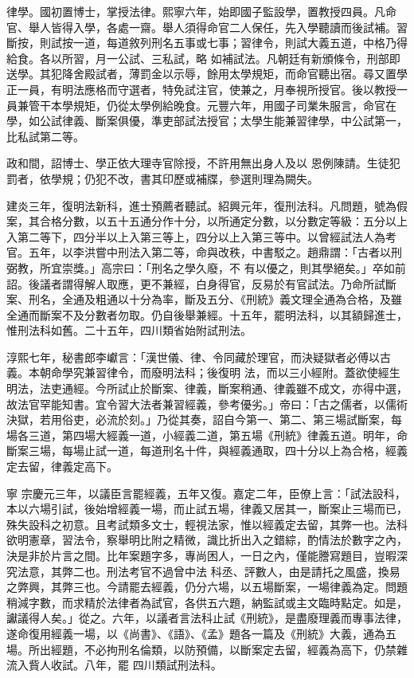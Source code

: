 \begin{pinyinscope}
 律學。國初置博士，掌授法律。熙寧六年，始即國子監設學，置教授四員。凡命官、舉人皆得入學，各處一齋。舉人須得命官二人保任，先入學聽讀而後試補。習斷按，則試按一道，每道敘列刑名五事或七事；習律令，則試大義五道，中格乃得給食。各以所習，月一公試、三私試，略
 如補試法。凡朝廷有新頒條令，刑部即送學。其犯降舍殿試者，薄罰金以示辱，餘用太學規矩，而命官聽出宿。尋又置學正一員，有明法應格而守選者，特免試注官，使兼之，月奉視所授官。後以教授一員兼管干本學規矩，仍從太學例給晚食。元豐六年，用國子司業朱服言，命官在學，如公試律義、斷案俱優，準吏部試法授官；太學生能兼習律學，中公試第一，比私試第二等。



 政和間，詔博士、學正依大理寺官除授，不許用無出身人及以
 恩例陳請。生徒犯罰者，依學規；仍犯不改，書其印歷或補牒，參選則理為闕失。



 建炎三年，復明法新科，進士預薦者聽試。紹興元年，復刑法科。凡問題，號為假案，其合格分數，以五十五通分作十分，以所通定分數，以分數定等級：五分以上入第二等下，四分半以上入第三等上，四分以上入第三等中。以曾經試法人為考官。五年，以李洪嘗中刑法入第二等，命與改秩，中書駁之。趙鼎謂：「古者以刑弼教，所宜崇獎。」高宗曰：「刑名之學久廢，不
 有以優之，則其學絕矣。」卒如前詔。後議者謂得解人取應，更不兼經，白身得官，反易於有官試法。乃命所試斷案、刑名，全通及粗通以十分為率，斷及五分、《刑統》義文理全通為合格，及雖全通而斷案不及分數者勿取。仍自後舉兼經。十五年，罷明法科，以其額歸進士，惟刑法科如舊。二十五年，四川類省始附試刑法。



 淳熙七年，秘書郎李巘言：「漢世儀、律、令同藏於理官，而決疑獄者必傅以古義。本朝命學究兼習律令，而廢明法科；後復明
 法，而以三小經附。蓋欲使經生明法，法吏通經。今所試止於斷案、律義，斷案稍通、律義雖不成文，亦得中選，故法官罕能知書。宜令習大法者兼習經義，參考優劣。」帝曰：「古之儒者，以儒術決獄，若用俗吏，必流於刻。」乃從其奏，詔自今第一、第二、第三場試斷案，每場各三道，第四場大經義一道，小經義二道，第五場《刑統》律義五道。明年，命斷案三場，每場止試一道，每道刑名十件，與經義通取，四十分以上為合格，經義定去留，律義定高下。



 寧
 宗慶元三年，以議臣言罷經義，五年又復。嘉定二年，臣僚上言：「試法設科，本以六場引試，後始增經義一場，而止試五場，律義又居其一，斷案止三場而已，殊失設科之初意。且考試類多文士，輕視法家，惟以經義定去留，其弊一也。法科欲明憲章，習法令，察舉明比附之精微，識比折出入之錯綜，酌情法於數字之內，決是非於片言之間。比年案題字多，專尚困人，一日之內，僅能謄寫題目，豈暇深究法意，其弊二也。刑法考官不過曾中法
 科丞、評數人，由是請托之風盛，換易之弊興，其弊三也。今請罷去經義，仍分六場，以五場斷案，一場律義為定。問題稍減字數，而求精於法律者為試官，各供五六題，納監試或主文臨時點定。如是，讞議得人矣。」從之。六年，以議者言法科止試《刑統》，是盡廢理義而專事法律，遂命復用經義一場，以《尚書》、《語》、《孟》題各一篇及《刑統》大義，通為五場。所出經題，不必拘刑名倫類，以防預備，以斷案定去留，經義為高下，仍禁雜流入貲人收試。八年，罷
 四川類試刑法科。




\end{pinyinscope}
